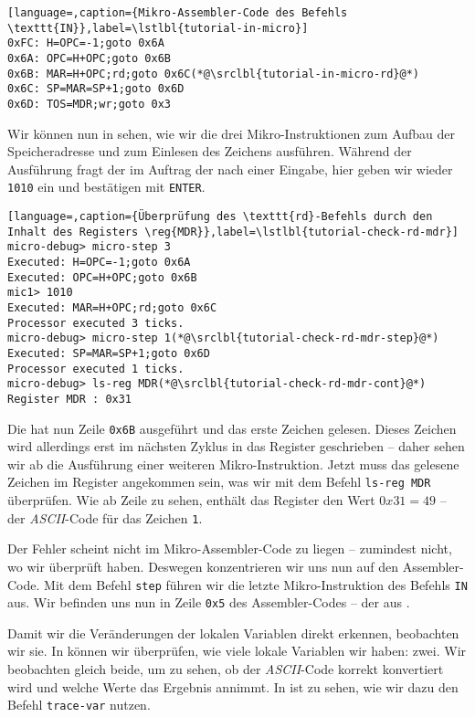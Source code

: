 \begin{lstlisting}[language=,caption={Mikro-Assembler-Code des Befehls \texttt{IN}},label=\lstlbl{tutorial-in-micro}]
0xFC: H=OPC=-1;goto 0x6A
0x6A: OPC=H+OPC;goto 0x6B
0x6B: MAR=H+OPC;rd;goto 0x6C(*@\srclbl{tutorial-in-micro-rd}@*)
0x6C: SP=MAR=SP+1;goto 0x6D
0x6D: TOS=MDR;wr;goto 0x3
\end{lstlisting}

Wir können nun in  sehen, wie wir die drei Mikro-Instruktionen zum Aufbau der Speicheradresse und zum Einlesen des Zeichens ausführen. Während der Ausführung fragt der \md{} im Auftrag der \mic{} nach einer Eingabe, hier geben wir wieder \texttt{1010} ein und bestätigen mit \texttt{ENTER}.

\begin{lstlisting}[language=,caption={Überprüfung des \texttt{rd}-Befehls durch den Inhalt des Registers \reg{MDR}},label=\lstlbl{tutorial-check-rd-mdr}]
micro-debug> micro-step 3
Executed: H=OPC=-1;goto 0x6A
Executed: OPC=H+OPC;goto 0x6B
mic1> 1010
Executed: MAR=H+OPC;rd;goto 0x6C
Processor executed 3 ticks.
micro-debug> micro-step 1(*@\srclbl{tutorial-check-rd-mdr-step}@*)
Executed: SP=MAR=SP+1;goto 0x6D
Processor executed 1 ticks.
micro-debug> ls-reg MDR(*@\srclbl{tutorial-check-rd-mdr-cont}@*)
Register MDR : 0x31
\end{lstlisting}

Die \mic{} hat nun Zeile \texttt{0x6B} ausgeführt und das erste Zeichen gelesen. Dieses Zeichen wird allerdings erst im nächsten Zyklus in das Register  geschrieben -- daher sehen wir ab  die Ausführung einer weiteren Mikro-Instruktion. Jetzt muss das gelesene Zeichen im Register  angekommen sein, was wir mit dem Befehl \texttt{ls-reg MDR} überprüfen. Wie ab Zeile  zu sehen, enthält das Register  den Wert $0x31=49$ -- der \emph{ASCII}-Code für das Zeichen \texttt{1}.

Der Fehler scheint nicht im Mikro-Assembler-Code zu liegen -- zumindest nicht, wo wir überprüft haben. Deswegen konzentrieren wir uns nun auf den Assembler-Code. Mit dem Befehl \texttt{step} führen wir die letzte Mikro-Instruktion des Befehls \texttt{IN} aus. Wir befinden uns nun in Zeile \texttt{0x5} des Assembler-Codes -- der  aus .

Damit wir die Veränderungen der lokalen Variablen direkt erkennen, beobachten wir sie. In  können wir überprüfen, wie viele lokale Variablen wir haben: zwei. Wir beobachten gleich beide, um zu sehen, ob der \emph{ASCII}-Code korrekt konvertiert wird und welche Werte das Ergebnis annimmt. In  ist zu sehen, wie wir dazu den Befehl \texttt{trace-var} nutzen.

